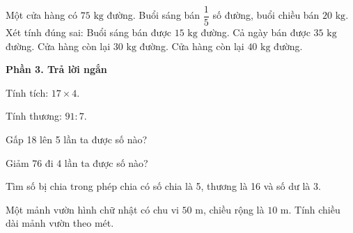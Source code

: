 \begin{ex} %
Một cửa hàng có $75\text{ kg}$ đường. Buổi sáng bán $\dfrac{1}{5}$ số đường, buổi chiều bán $20\text{ kg}$. Xét tính đúng sai:
\choiceTF
{\True Buổi sáng bán được $15\text{ kg}$ đường.}
{\True Cả ngày bán được $35\text{ kg}$ đường.}
{Cửa hàng còn lại $30\text{ kg}$ đường.}
{\True Cửa hàng còn lại $40\text{ kg}$ đường.}
\end{ex}

\textbf{Phần 3. Trả lời ngắn}

\begin{ex} %
Tính tích: $17 \times 4$.
\end{ex}

\begin{ex} %
Tính thương: $91 : 7$.
\end{ex}

\begin{ex} %
Gấp 18 lên 5 lần ta được số nào?
\end{ex}

\begin{ex} %
Giảm 76 đi 4 lần ta được số nào?
\end{ex}

\begin{ex} %
Tìm số bị chia trong phép chia có số chia là 5, thương là 16 và số dư là 3.
\end{ex}

\begin{ex} %
Một mảnh vườn hình chữ nhật có chu vi $50\text{ m}$, chiều rộng là $10\text{ m}$. Tính chiều dài mảnh vườn theo mét.
\end{ex}
